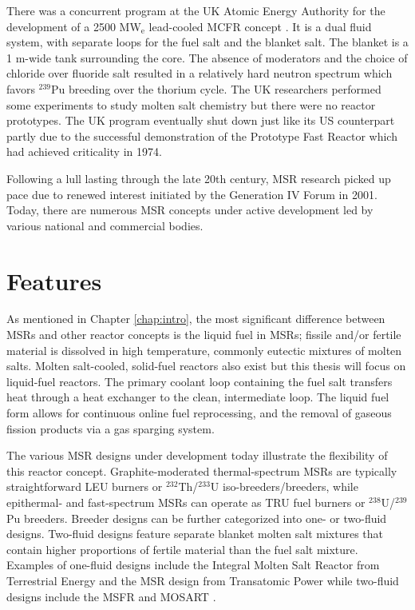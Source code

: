 There was a concurrent program at the UK Atomic Energy Authority for the
development of a 2500 MW$_{\text{e}}$ lead-cooled
\gls{MCFR} concept \cite{smith_assessment_1974}. It is a dual fluid system,
with separate loops for the fuel salt and the blanket salt. The blanket is a
1 m-wide tank surrounding the core. The absence of moderators and the choice
of chloride over fluoride salt resulted in a relatively hard neutron spectrum
which favors $^{239}$Pu breeding over the thorium cycle. The UK researchers
performed some experiments to study molten salt chemistry but there were no
reactor prototypes. The UK program eventually shut down just like its
US counterpart partly due to the successful demonstration of the Prototype
Fast Reactor which had achieved criticality in 1974.

Following a lull lasting through the late 20th century, \gls{MSR} research
picked up pace due to renewed interest initiated by the Generation IV Forum in
2001. Today, there are numerous \gls{MSR} concepts under active development
led by various national and commercial bodies.

\section{Features}

As mentioned in Chapter \ref{chap:intro}, the most significant difference
between \glspl{MSR} and other reactor concepts is the liquid fuel in
\glspl{MSR}; fissile and/or fertile material is dissolved in high temperature,
commonly eutectic mixtures of molten salts. Molten salt-cooled, solid-fuel
reactors also exist but this thesis will focus on liquid-fuel reactors.
The primary coolant loop containing the fuel salt
transfers heat through a heat exchanger to the clean, intermediate
loop. The liquid fuel form allows for continuous online fuel reprocessing,
and the removal of gaseous fission products via a gas sparging system.

The various \gls{MSR} designs under development today illustrate the
flexibility of this reactor concept. Graphite-moderated thermal-spectrum
\glspl{MSR} are typically straightforward \gls{LEU} burners or
$^{232}$Th/$^{233}$U iso-breeders/breeders, while epithermal- and
fast-spectrum \glspl{MSR} can operate as \gls{TRU} fuel burners or
$^{238}$U/$^{239}$Pu breeders. Breeder designs can be further categorized into
one- or two-fluid designs. Two-fluid designs feature separate blanket molten
salt mixtures that contain higher proportions of fertile material than the
fuel salt mixture. Examples of one-fluid designs include the Integral Molten
Salt Reactor from Terrestrial Energy \cite{leblanc_integral_2015} and the
\gls{MSR} design from Transatomic Power
\cite{transatomic_power_corporation_technical_2016} while two-fluid designs
include the \gls{MSFR} \cite{serp_molten_2014} and \gls{MOSART}
\cite{ignatiev_molten_2014}.

